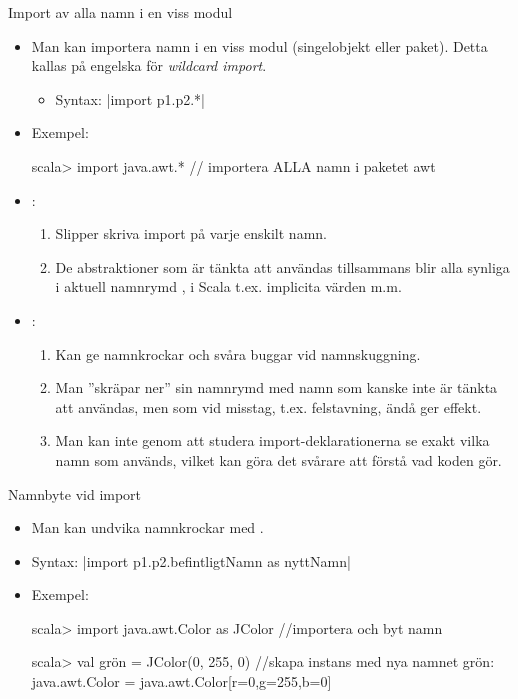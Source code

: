 \begin{Slide}{Import av alla namn i en viss modul}\SlideFontSmall
\begin{itemize}
\item Man kan importera  namn i en viss modul (singelobjekt eller paket). Detta kallas på engelska för \emph{wildcard import}.

\begin{itemize}\SlideFontTiny
  \item Syntax:  \code|import p1.p2.*|
\end{itemize}

\item Exempel:
\begin{REPL}
scala> import java.awt.*  // importera ALLA namn i paketet awt
\end{REPL}
\item {}:
\begin{enumerate}\SlideFontTiny
  \item Slipper skriva import på varje enskilt namn.
  \item De abstraktioner som är tänkta att användas tillsammans blir alla synliga i aktuell namnrymd , i Scala t.ex. implicita värden m.m.
\end{enumerate}
\item {}:
\begin{enumerate}\SlideFontTiny
  \item Kan ge namnkrockar och svåra buggar vid namnskuggning.
  \item Man ''skräpar ner'' sin namnrymd med namn som kanske inte är tänkta att användas, men som vid misstag, t.ex. felstavning, ändå ger effekt.
  \item Man kan inte genom att studera import-deklarationerna se exakt vilka namn som används, vilket kan göra det svårare att förstå vad koden gör.
\end{enumerate}
\end{itemize}
\end{Slide}


\begin{Slide}{Namnbyte vid import}
\begin{itemize}
\item Man kan undvika namnkrockar med .
\item Syntax:  \code|import p1.p2.befintligtNamn as nyttNamn|
\item Exempel:
\begin{REPL}
scala> import java.awt.Color as JColor //importera och byt namn

scala> val grön = JColor(0, 255, 0)  //skapa instans med nya namnet
grön: java.awt.Color = java.awt.Color[r=0,g=255,b=0]
\end{REPL}
\end{itemize}
\end{Slide}

